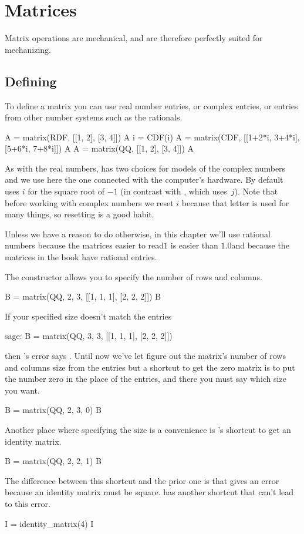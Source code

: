 \chapter{Matrices}

Matrix operations are mechanical, and are therefore perfectly suited for 
mechanizing.



\section{Defining}
To define a matrix 
you can use real number entries, or complex entries, or 
entries from other number systems such as the rationals. 
\begin{sageoutput}
A = matrix(RDF, [[1, 2], [3, 4]])
A
i = CDF(i)
A = matrix(CDF, [[1+2*i, 3+4*i], [5+6*i, 7+8*i]])
A
A = matrix(QQ, [[1, 2], [3, 4]])
A                               
\end{sageoutput}
\noindent
As with the real numbers, \Sage{} has two choices for models of the complex
numbers and we use here the one connected with the computer's hardware.
By default \Sage{} uses $i$ for the square root of $-1$ (in contrast with 
\python, which uses~$j$).
Note that before working with complex numbers we reset 
$i$ because that letter is used for many things, so 
resetting is a good habit.

Unless we have a reason to do otherwise, in this chapter
we'll use rational numbers because the matrices easier to 
read\Dash $1$ is easier than $1.0$\Dash and 
because the matrices in the book have rational entries.

The  constructor allows you to specify the number of
rows and columns.
\begin{sageoutput}
B = matrix(QQ, 2, 3, [[1, 1, 1], [2, 2, 2]])  
B
\end{sageoutput}
\noindent
If your specified size doesn't match the entries 
\begin{sageoutput}
sage: B = matrix(QQ, 3, 3, [[1, 1, 1], [2, 2, 2]])  
\end{sageoutput}
\noindent
then \Sage's error says
.
Until now we've let \Sage{} figure out the matrix's 
number of rows and columns size from the entries but
a shortcut to get the zero matrix 
is to put the number zero in the place of the entries, and there you
must say which size you want.
\begin{sageoutput}
B = matrix(QQ, 2, 3, 0)                     
B
\end{sageoutput}
\noindent
Another place where specifying the size is a convenience is 
\Sage's shortcut to get an identity matrix.
\begin{sageoutput}
B = matrix(QQ, 2, 2, 1)
B
\end{sageoutput}
\noindent
The difference between this shortcut and the prior one is that 
 gives an error because 
an identity matrix must be square.
\Sage{} has another shortcut that can't lead to this error.
\begin{sageoutput}
I = identity_matrix(4)
I
\end{sageoutput}

